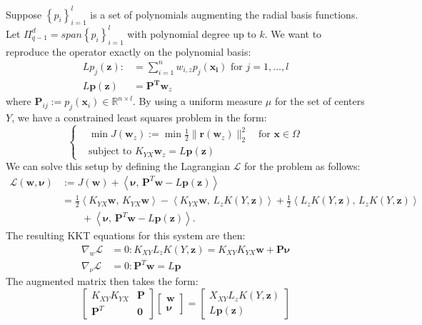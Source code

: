 \documentclass[11pt]{article}
\begin{document}
Suppose $\left\{p_i\right\}_{i=1}^l$ is a set of polynomials augmenting the radial basis functions. Let $\Pi_{q-1}^d=span\left\{p_i\right\}_{i=1}^l$ with polynomial degree up to $k$. We want to reproduce the operator exactly on the polynomial basis: 
\begin{align*}
	Lp_j(\bm{z}) :&= \sum_{i=1}^n w_{i,z} p_j(\bm{x_i}) \text{ for } j = 1, \hdots, l\\
	L\bm{p}(\bm{z}) &= \bm{P^T} \bm{w}_z
\end{align*}
where $\bm{P}_{ij} := p_j(\bm{x}_i) \in \mathbb{R}^{n \times l}$. By using a uniform measure $\mu$ for the set of centers $Y$, we have a constrained least squares problem in the form:
\begin{equation}
	\left\{
	\begin{aligned}
		&\min J(\bm{w}_z) := \min \frac{1}{2}\|\bm{r}(\bm{w}_z)\|_2^2 \quad \text{for } \bm{x} \in \Omega \\
		&\text{subject to } K_{YX} \bm{w}_z = L\bm{p}(\bm{z})
	\end{aligned}
	\right.
\end{equation}
We can solve this setup by defining the Lagrangian $\mathcal{L}$ for the problem as follows:
\begin{align*}
\mathcal{L}(\bm{w},\bm{\nu})
&:= J(\bm{w})
+ \left\langle \bm{\nu},\,\bm{P}^{T}\bm{w} - L\bm{p}(\bm{z}) \right\rangle \\
&= \frac{1}{2}
\left\langle K_{YX}\bm{w},\,K_{YX}\bm{w} \right\rangle
- \left\langle K_{YX}\bm{w},\,L_z K(Y, \bm{z}) \right\rangle
+ \frac{1}{2}
\left\langle L_z K(Y,\bm{z}),\,L_z K(Y,\bm{z}) \right\rangle \\
&\qquad
+ \left\langle \bm{\nu},\,\bm{P}^{T}\bm{w} - L\bm{p}(\bm{z}) \right\rangle.
\end{align*}
The resulting KKT equations for this system are then:
\begin{align*}
	\nabla_w \mathcal{L} &= 0: K_{XY} L_z K(Y,\bm{z}) = K_{XY} K_{YX} \bm{w} + \bm{P} \bm{\nu} \label{eq:normal_eq}\\
	\nabla_\nu \mathcal{L} &= 0: \bm{P}^T \bm{w} = L\bm{p}
\end{align*}
The augmented matrix then takes the form:
\begin{equation}
	\begin{bmatrix}
		K_{XY} K_{YX} & \bm{P} \\
		\bm{P}^T & \bm{0}
	\end{bmatrix}
	\begin{bmatrix}
		\bm{w} \\ \bm{\nu}
	\end{bmatrix} =
	\begin{bmatrix}
		X_{XY} L_z K(Y,\bm{z}) \\ L\bm{p}(\bm{z})
	\end{bmatrix}
	\label{eq:augmented}
\end{equation}
\end{document}
